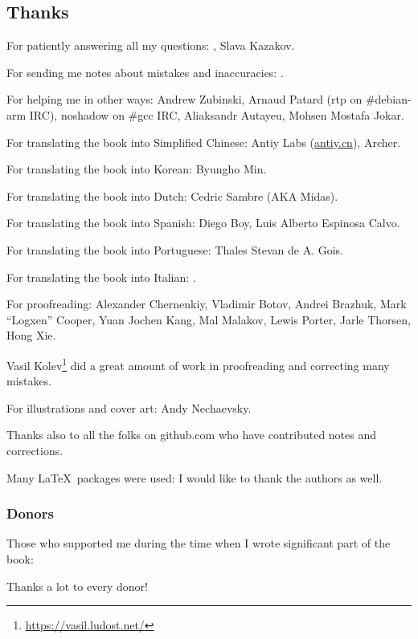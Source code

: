 \subsection*{Thanks}

For patiently answering all my questions: \HERMIT, Slava  Kazakov.

For sending me notes about mistakes and inaccuracies: \PeopleMistakesInaccuracies{}.

For helping me in other ways:
Andrew Zubinski,
Arnaud Patard (rtp on \#debian-arm IRC),
noshadow on \#gcc IRC,
Aliaksandr Autayeu,
Mohsen Mostafa Jokar.

For translating the book into Simplified Chinese:
Antiy Labs (\href{http://antiy.cn}{antiy.cn}), Archer.

For translating the book into Korean: Byungho Min.

For translating the book into Dutch: Cedric Sambre (AKA Midas).

For translating the book into Spanish: Diego Boy, Luis Alberto Espinosa Calvo.

For translating the book into Portuguese: Thales Stevan de A. Gois.

For translating the book into Italian: \PeopleItalianTranslators{}.

For proofreading:
Alexander  Chernenkiy,
Vladimir Botov,
Andrei Brazhuk,
Mark ``Logxen'' Cooper, Yuan Jochen Kang, Mal Malakov, Lewis Porter, Jarle Thorsen, Hong Xie.

Vasil Kolev\footnote{\url{https://vasil.ludost.net/}} did a great amount of work in proofreading and correcting many mistakes.

For illustrations and cover art: Andy Nechaevsky.

Thanks also to all the folks on github.com who have contributed notes and corrections.

Many \LaTeX\ packages were used: I would like to thank the authors as well.

\subsubsection*{Donors}

Those who supported me during the time when I wrote significant part of the book:



Thanks a lot to every donor!

